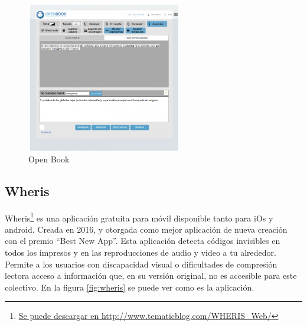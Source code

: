 \begin{figure}[h]
	\centering
	\includegraphics[width=0.6\textwidth]{Imagenes/ProyectosMateriales/openBook}
	\caption{Open Book}
	\label{fig:openBook}
\end{figure} 

\subsection{Wheris }

Wheris\footnote{\href{http://www.tematicblog.com/WHERIS\_Web//}{Se puede descargar en http://www.tematicblog.com/WHERIS\_Web/}} es una aplicación gratuita para móvil disponible tanto para iOs y android. Creada en 2016, y otorgada como mejor aplicación de nueva creación con el premio ``Best New App''. Esta aplicación detecta códigos invisibles en todos los impresos y en las reproducciones de audio y video a tu alrededor. Permite a los usuarios con discapacidad visual o dificultades de compresión lectora acceso a información que, en su versión original, no es accesible para este colectivo. En la figura \ref{fig:wheris} se puede ver como es la aplicación.



